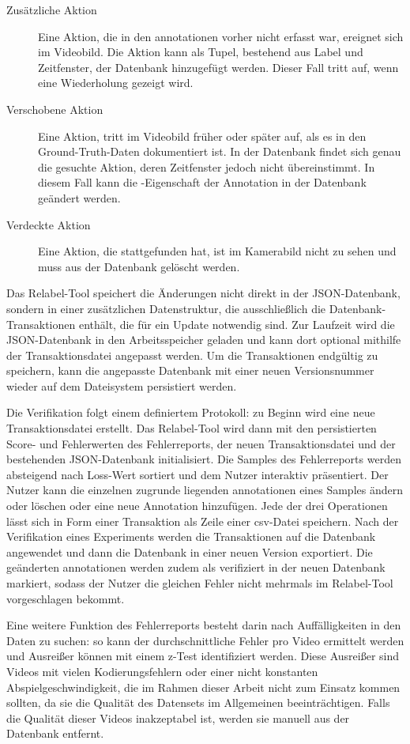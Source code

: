 \begin{description}
    \item[Zusätzliche Aktion] Eine Aktion, die in den \gls{annotationen} vorher nicht erfasst war, ereignet sich im Videobild.
    Die Aktion kann als Tupel, bestehend aus Label und Zeitfenster, der Datenbank hinzugefügt werden.
    Dieser Fall tritt \zB auf, wenn eine Wiederholung gezeigt wird.
    \item[Verschobene Aktion] Eine Aktion, tritt im Videobild früher oder später auf, als es in den Ground-Truth-Daten dokumentiert ist.
    In der Datenbank findet sich genau die gesuchte Aktion, deren Zeitfenster jedoch nicht übereinstimmt.
    In diesem Fall kann die -Eigenschaft der Annotation in der Datenbank geändert werden.
    \item[Verdeckte Aktion] Eine Aktion, die stattgefunden hat, ist im Kamerabild nicht zu sehen und muss aus der Datenbank gelöscht werden.
\end{description}

Das Relabel-Tool speichert die Änderungen nicht direkt in der JSON-Datenbank, sondern in einer zusätzlichen Datenstruktur, die ausschließlich die Datenbank-Transaktionen enthält, die für ein Update notwendig sind.
Zur Laufzeit wird die JSON-Datenbank in den Arbeitsspeicher geladen und kann dort optional mithilfe der Transaktionsdatei angepasst werden.
Um die Transaktionen endgültig zu speichern, kann die angepasste Datenbank mit einer neuen Versionsnummer wieder auf dem Dateisystem persistiert werden.

Die Verifikation folgt einem definiertem Protokoll:
zu Beginn wird eine neue Transaktionsdatei erstellt.
Das Relabel-Tool wird dann mit den persistierten Score- und Fehlerwerten des Fehlerreports, der neuen Transaktionsdatei und der bestehenden JSON-Datenbank initialisiert.
Die Samples des Fehlerreports werden absteigend nach Loss-Wert sortiert und dem Nutzer interaktiv präsentiert.
Der Nutzer kann die einzelnen zugrunde liegenden \gls{annotationen} eines Samples ändern oder löschen oder eine neue Annotation hinzufügen.
Jede der drei Operationen lässt sich in Form einer Transaktion als Zeile einer \gls{csv}-Datei speichern.
Nach der Verifikation eines Experiments werden die Transaktionen auf die Datenbank angewendet und dann die Datenbank in einer neuen Version exportiert.
Die geänderten \gls{annotationen} werden zudem als verifiziert in der neuen Datenbank markiert, sodass der Nutzer die gleichen Fehler nicht mehrmals im Relabel-Tool vorgeschlagen bekommt.

Eine weitere Funktion des Fehlerreports besteht darin nach Auffälligkeiten in den Daten zu suchen:
so kann der durchschnittliche Fehler pro Video ermittelt werden und Ausreißer können mit einem z-Test \cite{spiegelhalter2019art} identifiziert werden.
Diese Ausreißer sind \zB Videos mit vielen Kodierungsfehlern oder einer nicht konstanten Abspielgeschwindigkeit, die im Rahmen dieser Arbeit nicht zum Einsatz kommen sollten, da sie die Qualität des Datensets im Allgemeinen beeinträchtigen.
Falls die Qualität dieser Videos inakzeptabel ist, werden sie manuell aus der Datenbank entfernt.
